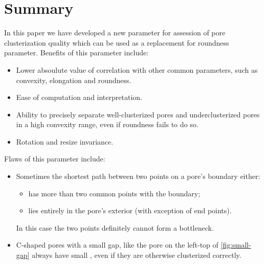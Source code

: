 \documentclass[reprint,amsmath,amssymb,aps,pre,showkeys,showpacs]{revtex4-1}
\newcommand{\highlight}[1]{{\color{red}{#1}}} %
\begin{document}
\section{Summary}
In this paper we have developed a new parameter for assession of pore
clusterization quality which can be used as a replacement for roundness
parameter. Benefits of this parameter include:
\begin{itemize}
\item Lower absoulute value of correlation with other common parameters, such as
  convexity, elongation and roundness.
\item Ease of computation and interpretation.
\item Ability to precisely separate well-clusterized pores and underclusterized
  pores in a high convexity range, even if roundness fails to do so.
\item Rotation and resize invariance.
\end{itemize}

Flaws of this parameter include:
\begin{itemize}
\item Sometimes the shortest path between two points on a pore's boundary either:
  \begin{itemize}
  \item has more than two common points with the boundary;
  \item lies entirely in the pore's exterior (with exception of end points).
  \end{itemize}
  In this case the two points definitely cannot form a bottleneck.
\item C-shaped pores with a small gap, like the pore on the left-top of
  \cref{fig:small-gap} always have small \highlight{awesomeness}, even if they
  are otherwise clusterized correctly.
\end{itemize}
\end{document}
